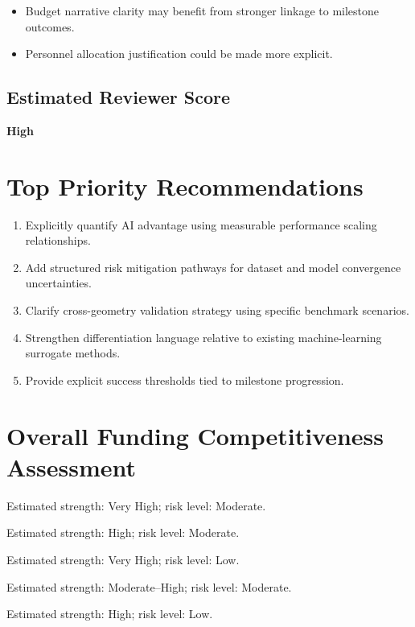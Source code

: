 \documentclass[11pt]{article}
\begin{document}
\begin{itemize}[leftmargin=1.5em]

\item Budget narrative clarity may benefit from stronger linkage to milestone outcomes.

\item Personnel allocation justification could be made more explicit.

\end{itemize}

\subsection*{Estimated Reviewer Score}

\textbf{High}

\section*{Top Priority Recommendations}

\begin{enumerate}[leftmargin=1.5em]

\item Explicitly quantify AI advantage using measurable performance scaling relationships.

\item Add structured risk mitigation pathways for dataset and model convergence uncertainties.

\item Clarify cross-geometry validation strategy using specific benchmark scenarios.

\item Strengthen differentiation language relative to existing machine-learning surrogate methods.

\item Provide explicit success thresholds tied to milestone progression.

\end{enumerate}

\section*{Overall Funding Competitiveness Assessment}

\begin{description}[leftmargin=2.5em,style=nextline]
\item[Scientific Merit] Estimated strength: Very High; risk level: Moderate.
\item[Technical Approach] Estimated strength: High; risk level: Moderate.
\item[Team and Resources] Estimated strength: Very High; risk level: Low.
\item[Commercialization] Estimated strength: Moderate--High; risk level: Moderate.
\item[Budget] Estimated strength: High; risk level: Low.
\end{description}
\end{document}
